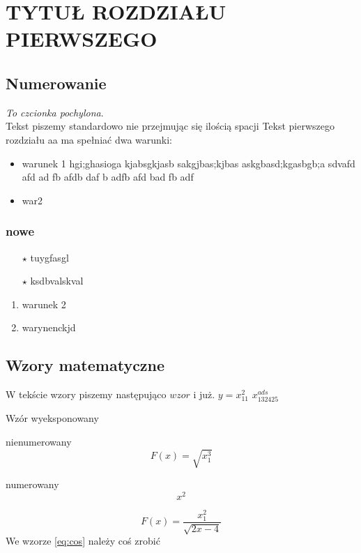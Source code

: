 \chapter{TYTUŁ ROZDZIAŁU PIERWSZEGO}

{%

\section{Numerowanie}
\textit{To czcionka       pochylona}. \\
Tekst piszemy standardowo nie przejmując się ilością spacji Tekst pierwszego rozdziału  aa
ma spełniać dwa warunki:
\begin{itemize}
    \item warunek 1 hgi;ghasioga kjabsgkjasb sakgjbas;kjbas askgbasd;kgasbgb;a sdvafd afd ad fb afdb daf b adfb afd bad fb adf
    \item war2
\end{itemize}
\subsection{nowe}
\begin{itemize}
	\item[$\star$] tuygfasgl
	\item[$\star$] ksdbvalskval
\end{itemize}
\begin{enumerate}
	\item warunek 2
	\item warynenckjd
\end{enumerate}

\section[skrót]{Wzory matematyczne}
W tekście wzory piszemy następująco $wzor$ i już. $y=x_{11}^2$ $x_{132425}^{ads}$

Wzór wyeksponowany

nienumerowany
$$
F(x)=\sqrt{x_1^3}
$$

numerowany
\begin{equation}
	\label{eq: wczesniej}
	x^2
\end{equation}

\begin{equation}
	\label{eq:cos} %
	F(x)=\frac{x_1^2}{\sqrt{2x-4}}
\end{equation}
We wzorze \eqref{eq:cos} należy coś zrobić

}
